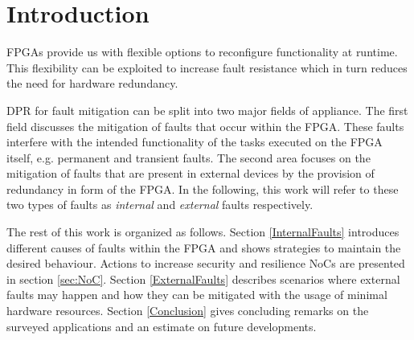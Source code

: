 
\section{Introduction}\label{Introduction}
\glspl{FPGA} provide us with flexible options to reconfigure functionality at runtime. 
This flexibility can be exploited to increase fault resistance which in turn reduces the need for hardware redundancy. 

\gls{DPR} for fault mitigation can be split into two major fields of appliance. 
The first field discusses the mitigation of faults that occur within the \gls{FPGA}.
These faults interfere with the intended functionality of the tasks executed on the \gls{FPGA} itself, e.g. permanent and transient faults. 
The second area focuses on the mitigation of faults that are present in external devices by the provision of redundancy in form of the \gls{FPGA}.
In the following, this work will refer to these two types of faults as \textit{internal} and \textit{external} faults respectively.

The rest of this work is organized as follows.
Section \ref{InternalFaults} introduces different causes of faults within the \gls{FPGA} and shows strategies to maintain the desired behaviour.
Actions to increase security and resilience \glspl{NoC} are presented in section \ref{sec:NoC}.
Section \ref{ExternalFaults} describes scenarios where external faults may happen and how they can be mitigated with the usage of minimal hardware resources. 
Section \ref{Conclusion} gives concluding remarks on the surveyed applications and an estimate on future developments.
